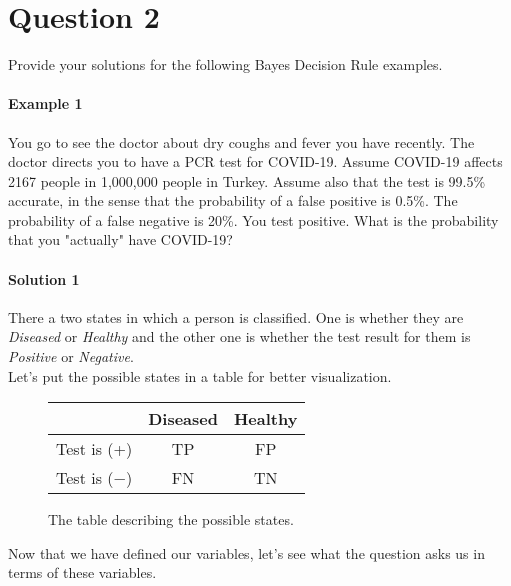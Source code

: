 \documentclass[12pt]{article}
\begin{document}
\pagebreak
\section{Question 2}\label{sec:q2}
Provide your solutions for the following Bayes Decision Rule examples.
\paragraph{Example 1}
You go to see the doctor about dry coughs and fever you have recently. The doctor directs you to have a PCR test for COVID-19.  Assume COVID-19 affects 2167 people in 1,000,000 people in Turkey. Assume also that the test is 99.5\% accurate, in the sense that the probability of a false positive is 0.5\%. The probability of a false negative is 20\%. You test positive. What is the probability that you "actually" have COVID-19?

\paragraph{Solution 1}
There a two states in which a person is classified. 
One is whether they are \textit{Diseased} or \textit{Healthy} and the other 
one is whether the test result for them is \textit{Positive} or \textit{Negative}. \\

Let's put the possible states in a table for better visualization.
\newcommand\ddfrac[2]{\frac{\displaystyle #1}{\displaystyle #2}}




\begin{figure}[h]
    \centering
    \begin{center}
        \begin{tabular}{|c|c|c|} 
         \hline
          & Diseased & Healthy \\ 
         \hline
         Test is (+) & TP & FP \\ 
         \hline
         Test is (\(-\)) & FN & TN \\ 
         \hline
        \end{tabular}
    \end{center}
    \caption{The table describing the possible states.}
    \label{table1}
\end{figure}


Now that we have defined our variables, 
let's see what the question asks us in terms of these variables. \\
\end{document}

